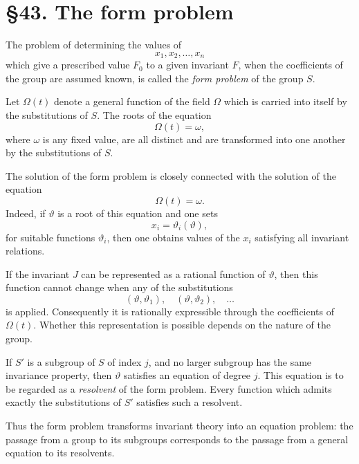 \documentclass[11pt]{article}
\newcommand{\webersection}[2]{\section*{\S #1. #2}\addcontentsline{toc}{section}{\S #1. #2}}
\begin{document}
\webersection{43}{The form problem}

The problem of determining the values of
\[
x_1,x_2,\ldots,x_n
\]
which give a prescribed value \(F_0\) to a given invariant \(F\), when the coefficients of the group are assumed known, is called the \emph{form problem} of the group \(S\).

Let \(\Omega(t)\) denote a general function of the field \(\Omega\) which is carried into itself by the substitutions of \(S\).  The roots of the equation
\[
\Omega(t)=\omega,
\]
where \(\omega\) is any fixed value, are all distinct and are transformed into one another by the substitutions of \(S\).

The solution of the form problem is closely connected with the solution of the equation
\[
\Omega(t)=\omega.
\]
Indeed, if \(\vartheta\) is a root of this equation and one sets
\begin{equation}
x_i=\vartheta_i(\vartheta),
\end{equation}
for suitable functions \(\vartheta_i\), then one obtains values of the \(x_i\) satisfying all invariant relations.

If the invariant \(J\) can be represented as a rational function of \(\vartheta\), then this function cannot change when any of the substitutions
\[
(\vartheta,\vartheta_1),\quad
(\vartheta,\vartheta_2),\quad\ldots
\]
is applied.  Consequently it is rationally expressible through the coefficients of \(\Omega(t)\).  Whether this representation is possible depends on the nature of the group.

If \(S'\) is a subgroup of \(S\) of index \(j\), and no larger subgroup has the same invariance property, then \(\vartheta\) satisfies an equation of degree \(j\).  This equation is to be regarded as a \emph{resolvent} of the form problem.  Every function which admits exactly the substitutions of \(S'\) satisfies such a resolvent.

Thus the form problem transforms invariant theory into an equation problem: the passage from a group to its subgroups corresponds to the passage from a general equation to its resolvents.
\end{document}
